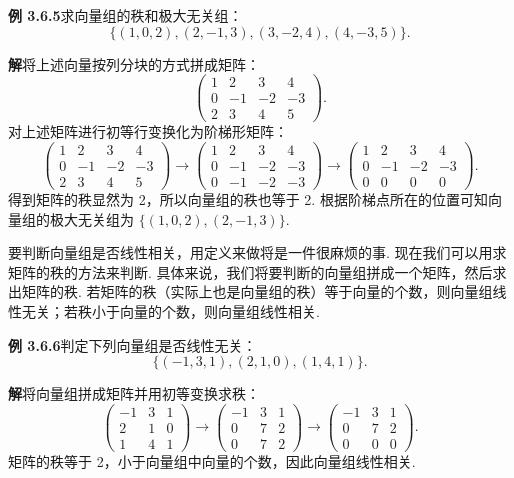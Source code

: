 \documentclass[UTF8,12pt,a4paper,fontset=fandol]{ctexart}
\begin{document}
\noindent\textbf{例 3.6.5}\quad 求向量组的秩和极大无关组：
\[
\{(1,0,2),(2,-1,3),(3,-2,4),(4,-3,5)\}.
\]

\noindent\textbf{解}\quad 将上述向量按列分块的方式拼成矩阵：
\[
\left(\begin{array}{rrrr}
1&2&3&4\\
0&-1&-2&-3\\
2&3&4&5
\end{array}\right).
\]
对上述矩阵进行初等行变换化为阶梯形矩阵：
\[
\left(\begin{array}{rrrr}
1&2&3&4\\
0&-1&-2&-3\\
2&3&4&5
\end{array}\right)
\to
\left(\begin{array}{rrrr}
1&2&3&4\\
0&-1&-2&-3\\
0&-1&-2&-3
\end{array}\right)
\to
\left(\begin{array}{rrrr}
1&2&3&4\\
0&-1&-2&-3\\
0&0&0&0
\end{array}\right).
\]
得到矩阵的秩显然为 2，所以向量组的秩也等于 2. 根据阶梯点所在的位置可知向量组的极大无关组为 $\{(1,0,2),(2,-1,3)\}$.

要判断向量组是否线性相关，用定义来做将是一件很麻烦的事. 现在我们可以用求矩阵的秩的方法来判断. 具体来说，我们将要判断的向量组拼成一个矩阵，然后求出矩阵的秩. 若矩阵的秩（实际上也是向量组的秩）等于向量的个数，则向量组线性无关；若秩小于向量的个数，则向量组线性相关.

\noindent\textbf{例 3.6.6}\quad 判定下列向量组是否线性无关：
\[
\{(-1,3,1),(2,1,0),(1,4,1)\}.
\]

\noindent\textbf{解}\quad 将向量组拼成矩阵并用初等变换求秩：
\[
\left(\begin{array}{rrr}
-1&3&1\\
2&1&0\\
1&4&1
\end{array}\right)
\to
\left(\begin{array}{rrr}
-1&3&1\\
0&7&2\\
0&7&2
\end{array}\right)
\to
\left(\begin{array}{rrr}
-1&3&1\\
0&7&2\\
0&0&0
\end{array}\right).
\]
矩阵的秩等于 2，小于向量组中向量的个数，因此向量组线性相关.
\end{document}
